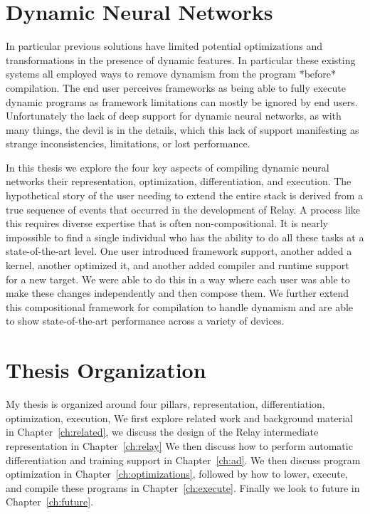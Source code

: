 \section{Dynamic Neural Networks}

In particular previous solutions have limited potential optimizations
  and transformations in the presence of dynamic features.
In particular these existing systems all employed ways to remove
  dynamism from the program *before* compilation.
The end user perceives frameworks as being able to
  fully execute dynamic programs as framework limitations can mostly be ignored by end
  users.
Unfortunately the lack of deep support for dynamic neural networks,
  as with many things, the devil is in the details, which this lack
  of support manifesting as strange inconsistencies, limitations, or lost performance.

In this thesis we explore the four key aspects of compiling dynamic
  neural networks their representation, optimization, differentiation,
  and execution.
The hypothetical story of the user needing to extend the entire stack is derived
  from a true sequence of events that occurred in the development of Relay.
A process like this requires diverse expertise that is often non-compositional.
It is nearly impossible to find a single individual who has the ability
  to do all these tasks at a state-of-the-art level.
One user introduced framework support, another added a kernel, another optimized it,
  and another added compiler and runtime support for a new target.
We were able to do this in a way where each user was able to make these
  changes independently and then compose them.
We further extend this compositional framework for compilation to handle dynamism
  and are able to show state-of-the-art performance across a variety of devices.

\section{Thesis Organization}

My thesis is organized around four pillars, representation, differentiation, optimization, execution,
We first explore related work and background material in Chapter~\ref{ch:related},
  we discuss the design of the Relay intermediate representation in Chapter~\ref{ch:relay}
We then discuss how to perform automatic differentiation and training support in Chapter~\ref{ch:ad}.
We then discuss program optimization in Chapter~\ref{ch:optimizations},
  followed by how to lower, execute, and compile these programs in
  Chapter~\ref{ch:execute}.
Finally we look to future in Chapter~\ref{ch:future}.




